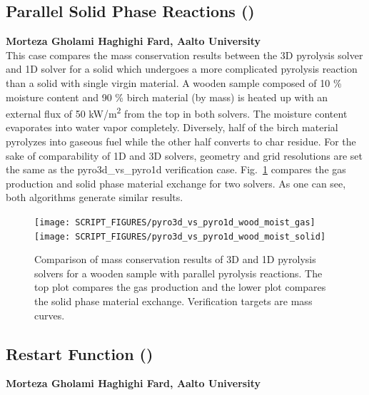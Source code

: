 \documentclass[11pt]{book}
\begin{document}
\subsection{Parallel Solid Phase Reactions (\texorpdfstring{}{pyro3d\_vs\_pyro1d\_wood\_moist})}
\label{pyro3d_vs_pyro1d_wood_moist}

\textbf{Morteza Gholami Haghighi Fard, Aalto University}\\

\noindent This case compares the mass conservation results between the 3D pyrolysis solver and 1D solver for a solid which undergoes a more complicated pyrolysis reaction than a solid with single virgin material. A wooden sample composed of 10 \% moisture content and 90 \% birch material (by mass) is heated up with an external flux of 50 \si{kW/m^2} from the top in both solvers. The moisture content evaporates into water vapor completely. Diversely, half of the birch material pyrolyzes into gaseous fuel while the other half converts to char residue. For the sake of comparability of 1D and 3D solvers, geometry and grid resolutions are set the same as the {\ct pyro3d\_vs\_pyro1d} verification case. Fig.~\ref{fig:pyro3d_vs_pyro1d_wood_moist} compares the gas production and solid phase material exchange for two solvers. As one can see, both algorithms generate similar results.

\begin{figure}[!htb]
	\centering
	\texttt{[image: SCRIPT\_FIGURES/pyro3d\_vs\_pyro1d\_wood\_moist\_gas]} \\
	\texttt{[image: SCRIPT\_FIGURES/pyro3d\_vs\_pyro1d\_wood\_moist\_solid]}
	\caption[PYRO3D parallel solid phase reactions (the {\ct pyro3d\_vs\_pyro1d\_wood\_moist} case)]{Comparison of mass conservation results of 3D and 1D pyrolysis solvers for a wooden sample with parallel pyrolysis reactions. The top plot compares the gas production and the lower plot compares the solid phase material exchange. Verification targets are mass curves.}
	\label{fig:pyro3d_vs_pyro1d_wood_moist}
\end{figure}

\subsection{Restart Function (\texorpdfstring{}{pyro3d\_restart})}
	\label{pyro3d_restart}

	\textbf{Morteza Gholami Haghighi Fard, Aalto University}\\
\end{document}
